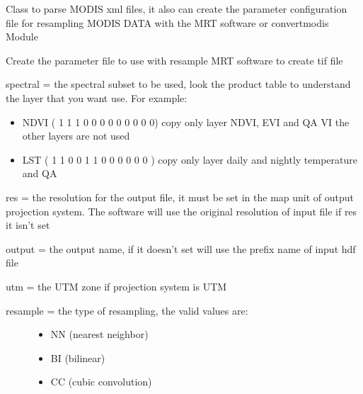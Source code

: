 \documentclass[a4paper,11pt,oneside]{sphinxmanual}
\begin{document}
\begin{fulllineitems}
\label{pymodis/pymodis:pymodis.parsemodis.parseModis}
Class to parse MODIS xml files, it also can create the parameter
configuration file for resampling MODIS DATA with the MRT software or
convertmodis Module

\begin{fulllineitems}
\label{pymodis/pymodis:pymodis.parsemodis.parseModis.confResample}
Create the parameter file to use with resample MRT software to create
tif file

spectral = the spectral subset to be used, look the product table to
understand the layer that you want use. For example:
\begin{itemize}
\item {} 
NDVI ( 1 1 1 0 0 0 0 0 0 0 0 0) copy only layer NDVI, EVI
and QA VI the other layers are not used

\item {} 
LST ( 1 1 0 0 1 1 0 0 0 0 0 0 ) copy only layer daily and
nightly temperature and QA

\end{itemize}

res = the resolution for the output file, it must be set in the map
unit of output projection system. The software will use the
original resolution of input file if res it isn't set

output = the output name, if it doesn't set will use the prefix name
of input hdf file

utm = the UTM zone if projection system is UTM
\begin{description}
\item[{resample = the type of resampling, the valid values are:}] \leavevmode\begin{itemize}
\item {} 
NN (nearest neighbor)

\item {} 
BI (bilinear)

\item {} 
CC (cubic convolution)


\end{itemize}
\end{description}
\end{fulllineitems}
\end{fulllineitems}
\end{document}
